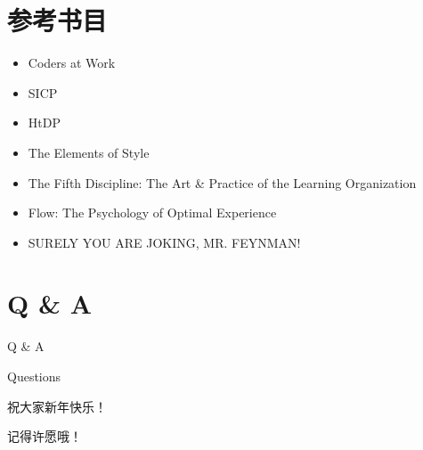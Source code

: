 \documentclass[presentation,dvipdfmx,CJKbookmarks]{beamer}
\begin{document}
\begin{CJK*}{UTF8}{simsun}
\section{参考书目}
\label{sec:org41530ce}

\begin{frame}[label={sec:orga0932d9}]{}
\begin{itemize}
\item Coders at Work
\item SICP
\item HtDP
\item The Elements of Style
\item The Fifth Discipline: The Art \& Practice of the Learning Organization
\item Flow: The Psychology of Optimal Experience
\item SURELY YOU ARE JOKING, MR. FEYNMAN!
\end{itemize}
\end{frame}
\section{Q \& A}
\label{sec:orgf14e376}
\begin{frame}[label={sec:orge0a9c00}]{Q \& A}
\begin{block}{Questions}
\pause
\end{block}
\begin{block}{祝大家新年快乐！}
\pause
\end{block}
\begin{block}{记得许愿哦！}
\end{block}
\end{frame}
\end{CJK*}
\end{document}
